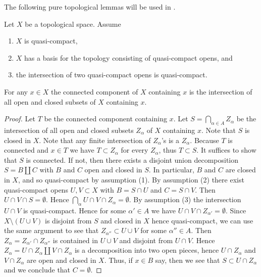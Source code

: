 The following pure topological lemmas will be used in .

\begin{lemma}
  \label{thm:connected-component-intersection-closed-open}
  Let $X$ be a topological space. Assume
  \begin{enumerate}
    \item $X$ is quasi-compact,
    \item $X$ has a basis for the topology consisting of quasi-compact opens, and
    \item the intersection of two quasi-compact opens is quasi-compact.
  \end{enumerate}
  For any $x \in X$ the connected component of $X$ containing $x$ is the intersection of all open and closed subsets of $X$ containing $x$.
\end{lemma}

\begin{proof}
  Let $T$ be the connected component containing $x$. Let $S = \bigcap_{\alpha \in A} Z_\alpha$ be the intersection of all open and closed subsets $Z_\alpha$ of $X$ containing $x$. Note that $S$ is closed in $X$. Note that any finite intersection of $Z_\alpha$'s is a $Z_\alpha$. Because $T$ is connected and $x \in T$ we have $T \subset Z_\alpha$ for every \(Z_\alpha\), thus \(T \subset S\). It suffices to show that $S$ is connected. If not, then there exists a disjoint union decomposition $S = B \amalg C$ with $B$ and $C$ open and closed in $S$. In particular, $B$ and $C$ are closed in $X$, and so quasi-compact by assumption (1). By assumption (2) there exist quasi-compact opens $U, V \subset X$ with $B = S \cap U$ and $C = S \cap V$. Then $U \cap V \cap S = \emptyset$. Hence $\bigcap_\alpha U \cap V \cap Z_\alpha = \emptyset$. By assumption (3) the intersection $U \cap V$ is quasi-compact. Hence for some $\alpha' \in A$ we have $U \cap V \cap Z_{\alpha'} = \emptyset$. Since $X \setminus (U \cup V)$ is disjoint from $S$ and closed in $X$ hence quasi-compact, we can use the same argument to see that $Z_{\alpha''} \subset U \cup V$ for some $\alpha'' \in A$. Then $Z_\alpha = Z_{\alpha'} \cap Z_{\alpha''}$ is contained in $U \cup V$ and disjoint from $U \cap V$. Hence $Z_\alpha = U \cap Z_\alpha \amalg V \cap Z_\alpha$ is a decomposition into two open pieces, hence $U \cap Z_\alpha$ and $V \cap Z_\alpha$ are open and closed in $X$. Thus, if $x \in B$ say, then we see that $S \subset U \cap Z_\alpha$ and we conclude that $C = \emptyset$.
\end{proof}

